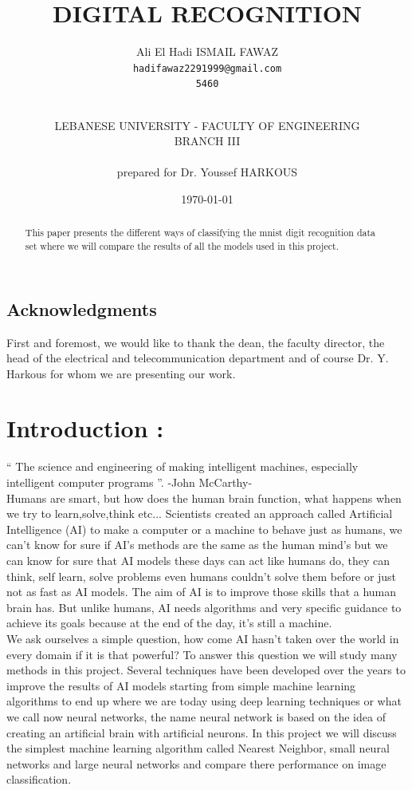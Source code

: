 \documentclass[10pt,a4paper]{article}
\author{Ali El Hadi ISMAIL FAWAZ\\
\texttt{hadifawaz2291999@gmail.com}\\
\texttt{5460}\\\\
\and
LEBANESE UNIVERSITY - FACULTY OF ENGINEERING\\
BRANCH III\\\\
\small prepared for Dr. Youssef HARKOUS}
\date{\today}
\title{\myfont DIGITAL RECOGNITION}
\begin{document}
\maketitle
\titlepage
\tableofcontents
\newpage
\listoffigures
\newpage
\begin{center}
\section*{Acknowledgments}
First and foremost, we would like to thank the dean, the faculty director, the head of the electrical and telecommunication department and of course Dr. Y. Harkous for whom we are presenting our work.
\end{center}

\begin{abstract}
This paper presents the different ways of classifying the mnist digit recognition data set where we will compare the results of all the models used in this project.
\end{abstract}

\section{Introduction :}
\large “ The science and engineering of making intelligent machines, especially intelligent computer programs ”. -John McCarthy-\\
Humans are smart, but how does the human brain function, what happens when we try to learn,solve,think etc... Scientists created an approach called Artificial Intelligence (AI) to make a computer or a machine to behave just as humans, we can't know for sure if AI's methods are the same as the human mind's but we can know for sure that AI models these days can act like humans do, they can think, self learn, solve problems even humans couldn't solve them before or just not as fast as AI models. The aim of AI is to improve those skills that a human brain has. But unlike humans, AI needs algorithms and very specific guidance to achieve its goals because at the end of the day, it's still a machine.\\
We ask ourselves a simple question, how come AI hasn't taken over the world in every domain if it is that powerful? To answer this question we will study many methods in this project. Several techniques have been developed over the years to improve the results of AI models starting from simple machine learning algorithms to end up where we are today using deep learning techniques or what we call now neural networks, the name neural network is based on the idea of creating an artificial brain with artificial neurons. In this project we will discuss the simplest machine learning algorithm called Nearest Neighbor, small neural networks and large neural networks and compare there performance on image classification.
\end{document}

